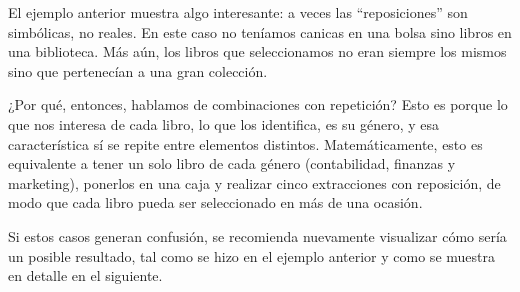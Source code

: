 \documentclass[
  letterpaper,
  DIV=11,
  numbers=noendperiod]{scrreprt}
\begin{document}
El ejemplo anterior muestra algo interesante: a veces las
``reposiciones'' son simbólicas, no reales. En este caso no teníamos
canicas en una bolsa sino libros en una biblioteca. Más aún, los libros
que seleccionamos no eran siempre los mismos sino que pertenecían a una
gran colección.

¿Por qué, entonces, hablamos de combinaciones con repetición? Esto es
porque lo que nos interesa de cada libro, lo que los identifica, es su
género, y esa característica sí se repite entre elementos distintos.
Matemáticamente, esto es equivalente a tener un solo libro de cada
género (contabilidad, finanzas y marketing), ponerlos en una caja y
realizar cinco extracciones con reposición, de modo que cada libro pueda
ser seleccionado en más de una ocasión.

Si estos casos generan confusión, se recomienda nuevamente visualizar
cómo sería un posible resultado, tal como se hizo en el ejemplo anterior
y como se muestra en detalle en el siguiente.
\end{document}
